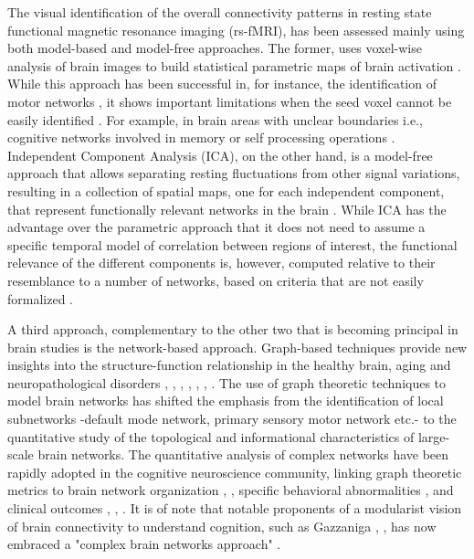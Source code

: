 \documentclass[12pt,a4paper]{article}
\begin{document}
The visual identification of the
overall connectivity patterns in resting state functional magnetic resonance
imaging (rs-fMRI), has been assessed mainly using both model-based and model-free
approaches. The former, uses voxel-wise analysis of brain images to build statistical parametric maps of brain activation \cite{biswal_functional_1995}. 
While this approach has been successful in, for instance, 
the identification of motor networks \cite{robinson_resting_2009}, it shows important limitations when
the seed voxel cannot be easily identified \cite{maldjian_functional_2001}.  
For example, in brain areas with unclear boundaries i.e., cognitive networks involved in memory or self processing operations \cite{fingelkurts_persistent_2011}. 
Independent Component Analysis (ICA), on
the other hand, is a model-free approach that allows separating resting
fluctuations from other signal variations, resulting in a collection of spatial
maps, one for each independent component, that represent functionally relevant networks in the brain
\cite{calhoun_review_2009}.
While ICA has the advantage over the parametric approach that it does not need to
assume a specific temporal model of correlation between regions of
interest, the functional relevance of the different components is, however,
computed relative to their resemblance to a number of networks, based on
criteria that are not easily formalized \cite{biswal_toward_2010}.

A third approach, complementary to the other two that is becoming principal in brain studies is the network-based approach. Graph-based techniques provide new
insights into the structure-function relationship in the healthy brain, aging and neuropathological disorders \cite{fair_functional_2009}, 
\cite{wang_graph-based_2010}, \cite{he_graph_2010}, \cite{wang_graph_2011}, \cite{yu_altered_2011}, \cite{brier_functional_2014}, \cite{sala-llonch_changes_2014}. 
The use of graph theoretic techniques to model brain networks has shifted the 
emphasis from the identification of local subnetworks -default mode network,
primary sensory motor network etc.- to the quantitative study of the topological
and informational characteristics of large-scale brain networks.
The quantitative analysis of complex networks have been rapidly adopted in the cognitive neuroscience community, linking graph theoretic metrics  to brain network organization \cite{bullmore_complex_2009}, \cite{sporns_contributions_2014},  specific behavioral abnormalities \cite{tschernegg_abnormalities_2013}, \cite{cocchi_functional_2012} and  clinical outcomes \cite{yuan_structural_2015}, \cite{anderson_abnormal_2013}, \cite{dickerson_large-scale_2009} . It is of note that notable proponents of a modularist vision of brain
connectivity to understand cognition, such as Gazzaniga
\cite{gazzaniga_new_1999}, \cite{Fuster:2000}, has
now embraced a "complex brain networks approach" \cite{bassett_understanding_2011}. 
\end{document}
